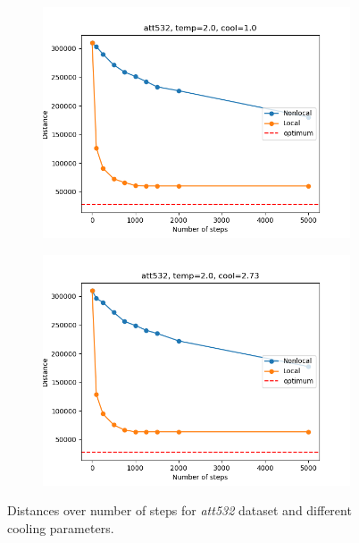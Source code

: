 \begin{figure}[!htb]
	\centering
	\begin{subfigure}{0.45\textwidth}
		\includegraphics[width=\textwidth]{img/att532_temp=2.0_cool=1.0}
	\end{subfigure}
	\begin{subfigure}{0.45\textwidth}
		\includegraphics[width=\textwidth]{img/att532_temp=2.0_cool=2.73}
	\end{subfigure}
	\caption{Distances over number of steps for \textit{att532} dataset and different cooling parameters.}
	\label{fig:att532_comp}
\end{figure}

